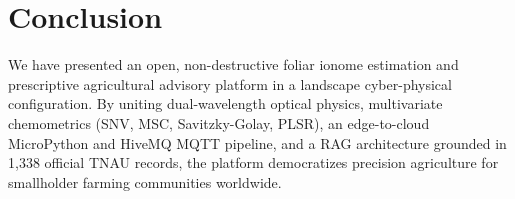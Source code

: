 \documentclass[9pt,twocolumn,a4paper,landscape]{article}
\begin{document}
\section{Conclusion}
\label{sec:conclusion}
We have presented an open, non-destructive foliar ionome estimation and prescriptive agricultural advisory platform in a landscape cyber-physical configuration. By uniting dual-wavelength optical physics, multivariate chemometrics (SNV, MSC, Savitzky-Golay, PLSR), an edge-to-cloud MicroPython and HiveMQ MQTT pipeline, and a RAG architecture grounded in 1,338 official TNAU records, the platform democratizes precision agriculture for smallholder farming communities worldwide.
\end{document}
